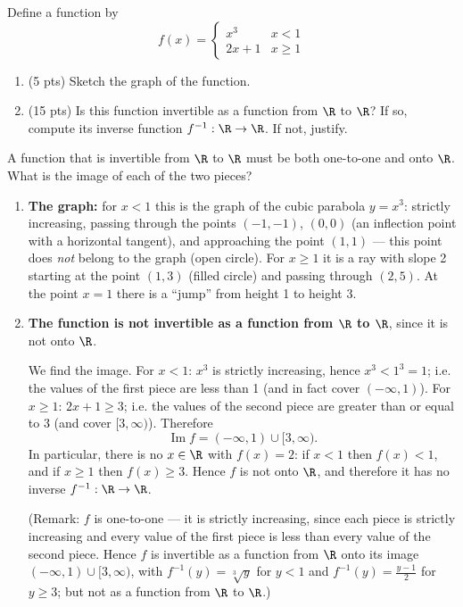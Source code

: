 
\begin{question}
Define a function by
\[
f(x)=\begin{cases}
x^3 & x<1\\
2x+1 & x\ge 1
\end{cases}
\]
\begin{enumerate}
  \item (5 pts) Sketch the graph of the function.
  \item (15 pts) Is this function invertible as a function from $\R$ to $\R$?
  If so, compute its inverse function $f^{-1}:\R\to\R$.
  If not, justify.
\end{enumerate}
\end{question}

\begin{hint}
A function that is invertible from $\R$ to $\R$ must be both one-to-one and onto $\R$. What is the image of each of the two pieces?
\end{hint}

\begin{solution}
\begin{enumerate}
  \item \textbf{The graph:} for $x<1$ this is the graph of the cubic parabola $y=x^3$: strictly increasing, passing through the points $(-1,-1)$, $(0,0)$ (an inflection point with a horizontal tangent), and approaching the point $(1,1)$ --- this point does \emph{not} belong to the graph (open circle). For $x\ge1$ it is a ray with slope 2 starting at the point $(1,3)$ (filled circle) and passing through $(2,5)$. At the point $x=1$ there is a ``jump'' from height 1 to height 3.
  \item \textbf{The function is not invertible as a function from $\R$ to $\R$}, since it is not onto $\R$.

  We find the image. For $x<1$: $x^3$ is strictly increasing, hence $x^3<1^3=1$; i.e. the values of the first piece are less than 1 (and in fact cover $(-\infty,1)$). For $x\ge1$: $2x+1\ge3$; i.e. the values of the second piece are greater than or equal to 3 (and cover $[3,\infty)$). Therefore
  \[
  \operatorname{Im}f=(-\infty,1)\cup[3,\infty).
  \]
  In particular, there is no $x\in\R$ with $f(x)=2$: if $x<1$ then $f(x)<1$, and if $x\ge1$ then $f(x)\ge3$. Hence $f$ is not onto $\R$, and therefore it has no inverse $f^{-1}:\R\to\R$.

  (Remark: $f$ is one-to-one --- it is strictly increasing, since each piece is strictly increasing and every value of the first piece is less than every value of the second piece. Hence $f$ is invertible as a function from $\R$ onto its image $(-\infty,1)\cup[3,\infty)$, with $f^{-1}(y)=\sqrt[3]{y}$ for $y<1$ and $f^{-1}(y)=\frac{y-1}{2}$ for $y\ge3$; but not as a function from $\R$ to $\R$.)
\end{enumerate}
\end{solution}
